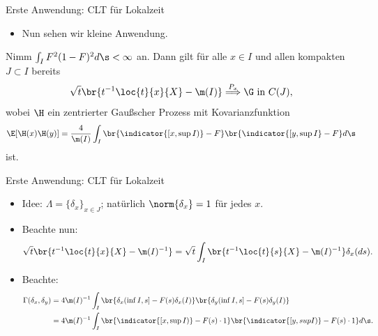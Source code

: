 \begin{frame}{Erste Anwendung: CLT für Lokalzeit}
    \begin{itemize}
        \item Nun sehen wir kleine Anwendung.
    \end{itemize}
    \begin{theoremblock}
        Nimm $\int_I F^2(1-F)^2 d\s < \infty$ an. Dann gilt für alle $x \in I$ und allen kompakten $J \subset I$ bereits \[
\sqrt{t}\br{t^{-1}\loc{t}{x}{X} - \m(I)} \overset{P_x}{\Longrightarrow} \G \text{ in } C(J),
        \] wobei $\H$ ein zentrierter Gaußscher Prozess mit Kovarianzfunktion \[
        \E[\H(x)\H(y)] = \frac{4}{\m(I)} \int_I \br{\indicator{[x, \sup I)} - F}\br{\indicator{[y, \sup I} - F} d \s
        \] ist.
    \end{theoremblock}
\end{frame}
\begin{frame}{Erste Anwendung: CLT für Lokalzeit}
    \begin{proofs}
        \begin{itemize}
            \item Idee: $\Lambda = \{\delta_x\}_{x \in J}$; natürlich $\norm{\delta_x} = 1$ für jedes $x$.
            \item Beachte nun: \[\sqrt{t}\br{t^{-1}\loc{t}{x}{X} - \m(I)^{-1}} = \sqrt{t}\int_I \br{t^{-1}\loc{t}{s}{X} - \m(I)^{-1}} \delta_x(ds).\]
            \item Beachte: \begin{align*}
            \Gamma(\delta_x, \delta_y) &= 4\m(I)^{-1}\int_I \br{\delta_x(\inf I, s] - F(s)\delta_x(I)}\br{\delta_y(\inf I, s] - F(s)\delta_y(I)} \\
            &= 4\m(I)^{-1}\int_I \br{\indicator{[x, \sup I)} - F(s) \cdot 1}\br{\indicator{[y, sup I)} - F(s)\cdot 1} d\s.
        \end{align*}
       \end{itemize}
    \end{proofs}
\end{frame}

